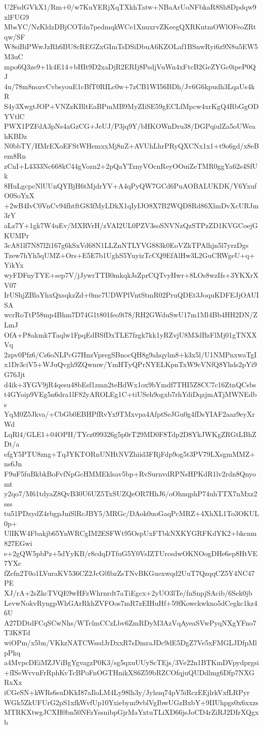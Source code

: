 U2FsdGVkX1/Rm+0/w7KuYERjXqTXkhTatw+NBaArUoNFbkaR8Sh8Dpdqw9xlFUG9
MbsYC/NzKldzDBjCOTdn7pedmqkWCe1XnuxrvZKeegQXRKntmOWlOFeoZRtqw/SF
W8siBiPWwJzRh6BU8cREGZxGImTsDSiDbuA6KZOLaf1BSnwRyi6z9N8u5EW5M3uC
mpo6Q3ze9+1k4E14+bHIt9D2xaDjR2ERIj8PsdjVuWn4xFtcB2GeZYGc0ipeP0QJ
4u/78m8nozvCvbsyouE1cBfT0RILc0w+7zCB1WI56BDh/Jv6G6kpudh3LqaUs4kR
S4y3XwgtJOP+VNZzKBltEaBPmMB9MyZIiSE59gECLfMpcw4xrKgQ4RbGgODYVtlC
PWX1PZFdA3pNs4aGzCG+JeUJ/P3jq9Y/bHKOWnDru38/DGPqiulZa5oUWeahKBDz
N0bbTY/HMrEXoEFStWHemxxMj8nZ+AVUhLhrPRyQXCNx1x1+t9o6gd/x8eBem8Rn
zCnI+L4333Nc668kC44gVozn2+2pQaYTznyVOcnReyOOuiZeTMR0ggYa62s4SfUk
8HuLgcpcNlUUnQYBjH6tMjdrYV+A4qPyQW7GCd6PuAOBALUKDK/Y6YxufO0SoYxX
+2wB4IvC0VnCv94fhtftG83fMyLDkX1qIyIJO8X7B2WQD8Rd86XlmDvXcURJm3rY
aLz7Y+1gk7W4uEv/MXRVrH/zVAI2UL0PZV3soSNVNzQzSTPzZD1KVGCoejGKUMPr
3cA81lf7N87l2i167g6kSxVd68N1LLZnNTLYVG883k0EoVZkTPAlhjn5l7yrzDgs
Tzew7hYh5qUMZ+Ors+E5E7b1UghS5YuyizTcCQ9EfAlHw3L2GuCRWgeU+q+YikYx
wyFDFnyTYE+sep7V/jJywrTTB0mkqkJsZprCQTvyHwr+8LOs8wzIfs+3YKXrXV07
IrUShjZBlaYhxQxsqkzZd+0mc7UDWPlVntStmR02PruQDEt3JoquKDFEJjOAUISA
wcrRoTtP58mp4Bhm7D74G1t801feo9i78/RH2GWduSwU17m1Ml4Bb4HH2DN/ZLmJ
OfA+P8akmk7Taqlw1FpqEdBSfDxTLE7fzgk7kk1yRZvjU8M3dBzFlMj01gTNXXVq
2zpv0Pfz6/Cs6oNLPcG7HnzVpregSBnocQH8g9ahqylm8+k3x5l/U1NMPnxwaTgI
x1Dr3ciV5+WJuQvgh9ZQwmw/YmHTyQPrNYELKpnTxW9cVNfQ8Yhds2pYi9G76Jjt
d4ik+3YGV9jR4qesu48bEsf1zmn2teHdWx1ox9bYmdf7THI5Z8CC7c16ZtnQCsbs
t4GYoip9VEg5n6dra1lF82yAROLEg1C+tiUSeh9ogxb7rhYdiDqzjmATjMWNEdbs
YqM0Z5Jkva/+CbGb0EBHPfRvYx9TMxvpa4AfptSeJGu0g4fDsYIAF2aaz9eyXrWd
LqRl4/GLE1+04OPH/TYcz099326g5p0rT29MD0F8Tdp2D8YkJWKgZRGtLBhZDt/a
efgY5PTU8zng+TqJYKTORnUNHtNVZhiid3FRjFdp9og5t3PV79LXsgmMMZ+ns6Jn
F9uF5fuBkbkBoFvfNpGcHMMEklsav5bp+RvSurnvdRPNsHPKdR1lv2rdn8Qnyomt
y2qo7/M61tdyaZ8QvB30U6UZ5TxSUZQeOR7HhJ6/oOhnqphP74uhTTX7nMxz2sss
tu51PDzydZ4rbgpJniSlRcJBY5/MRGc/DAok0uoGaqPcMRZ+4XhXL1To3OKUL0p+
UlIKW4Fbakjb65YnWRCgIM2ESFWt95OspUxFTbkNXKYGRFKdYK2+bkcnm827EGwi
e+2gQW5pbPz+5dYyKB/r8cdqDTfuG5Y0VsIZTUrcsdwOKNOogDHe6ep8HtVE7YXc
fZefn2T0o1LVuraKV536CZ2JcG0lbzZsTNvBKGuexwqd2UuT7QzqqCZ5Y4NC47PE
XJ/rA+2sZkcTVQE9wHFzWhrnrdt7aTiEgcx+2yUO3lTe/fnSnpjSAcib/6Sek0jb
LevwNokvRyngpWhGArRkhZVFOos7mR7zEIHuHf+59fKowckwkno5dCegkc1kz46U
A27DDtdFCqSCwNhs/WTclmCCzLbv6ZmRDyM3AzVqAyeaSVwPyqNXgYFno7T3K8Td
wiOPm/x5bn/VKkzNATCWssdJrDxxR7sDmraJDc9dE5DgZ7Ve5xFMGLJDfpMlpPkq
a4MvpcDEiMZJViBgYgvagzP0K3/sg5qxuUUyScTEjs/3Ve22n1BTKmDVpydprgsi
+fISeWvvnFrRphKvTcBPoFnOGTHnikXS6Z59bRZCOfqjuQUDdlmg6Dfp7NXGRxXx
iCGeSN+kWRs6suDKkI87aIloLM4Ly98lh3y/Jyhuq74pV5iRczEEjlrkVxfLRPyr
WGk5ZkUFUrG2pS1xfkWvfUp10Yxiebym9vblVgIbwUGzBxbY+9IIUhpgs0x6xxzs
MTRKXtwgJCXH0bn50NFzYssnibpGjrMaYxtuTLiXD66jsJoCD4rZiRJ2DIrXQgxb
